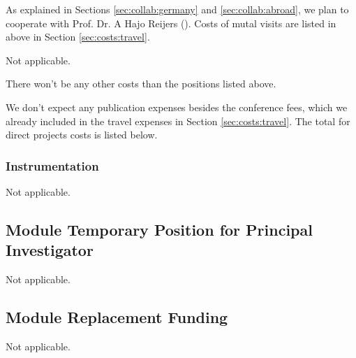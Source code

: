 
As explained in Sections \ref{sec:collab:germany} and \ref{sec:collab:abroad}, we plan to cooperate with Prof. Dr. A Hajo Reijers (). Costs of mutal visits are listed in above in Section \ref{sec:costs:travel}.


Not applicable. 


There won't be any other costs than the positions listed above. 


We don't expect any publication expenses besides the conference fees, which we already included in the travel expenses in Section \ref{sec:costs:travel}. The total for direct projects costs is listed below. 

\subsubsection{Instrumentation}

Not applicable. 

\subsection{Module Temporary Position for Principal Investigator}

Not applicable. 

\subsection{Module Replacement Funding}

Not applicable. 